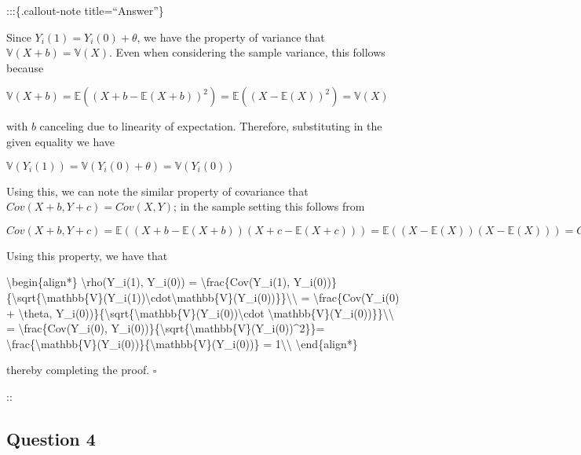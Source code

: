 \documentclass[
  11pt,
  letterpaper,
  DIV=11,
  numbers=noendperiod]{scrartcl}
\newenvironment{Shaded}{}{}
\newcommand{\NormalTok}[1]{\textcolor[rgb]{0.24,0.22,0.21}{#1}}
\begin{document}
:::\{.callout-note title=``Answer''\}

Since \(Y_i(1) = Y_i(0) + \theta\), we have the property of variance
that \(\mathbb{V}(X + b) = \mathbb{V}(X)\). Even when considering the
sample variance, this follows because

\(\mathbb{V}(X + b) = \mathbb{E}((X + b - \mathbb{E}(X + b))^2) = \mathbb{E}((X - \mathbb{E}(X))^2) = \mathbb{V}(X)\)

with \(b\) canceling due to linearity of expectation. Therefore,
substituting in the given equality we have

\(\mathbb{V}(Y_i(1)) = \mathbb{V}(Y_i(0) + \theta) = \mathbb{V}(Y_i(0))\)

Using this, we can note the similar property of covariance that
\(Cov(X + b, Y + c) = Cov(X, Y)\); in the sample setting this follows
from

\(Cov(X + b, Y + c) = \mathbb{E}((X + b - \mathbb{E}(X + b))(X + c - \mathbb{E}(X + c))) = \mathbb{E}((X - \mathbb{E}(X))(X - \mathbb{E}(X)))= Cov(X, Y)\)

Using this property, we have that

\begin{Shaded}
\begin{Highlighting}[]
\NormalTok{\textbackslash{}begin\{align*\}}
\NormalTok{\textbackslash{}rho(Y\_i(1), Y\_i(0)) = \textbackslash{}frac\{Cov(Y\_i(1), Y\_i(0))\}\{\textbackslash{}sqrt\{\textbackslash{}mathbb\{V\}(Y\_i(1))\textbackslash{}cdot\textbackslash{}mathbb\{V\}(Y\_i(0))\}\}\textbackslash{}\textbackslash{}}
\NormalTok{= \textbackslash{}frac\{Cov(Y\_i(0) + \textbackslash{}theta, Y\_i(0))\}\{\textbackslash{}sqrt\{\textbackslash{}mathbb\{V\}(Y\_i(0))\textbackslash{}cdot \textbackslash{}mathbb\{V\}(Y\_i(0))\}\}\textbackslash{}\textbackslash{}}
\NormalTok{= \textbackslash{}frac\{Cov(Y\_i(0), Y\_i(0))\}\{\textbackslash{}sqrt\{\textbackslash{}mathbb\{V\}(Y\_i(0))\^{}2\}\}= \textbackslash{}frac\{\textbackslash{}mathbb\{V\}(Y\_i(0))\}\{\textbackslash{}mathbb\{V\}(Y\_i(0))\} = 1\textbackslash{}\textbackslash{}}
\NormalTok{\textbackslash{}end\{align*\}}
\end{Highlighting}
\end{Shaded}

thereby completing the proof. \(\square\)

::

\newpage{}

\hypertarget{question-4}{%
\subsection{Question 4}\label{question-4}}
\end{document}
